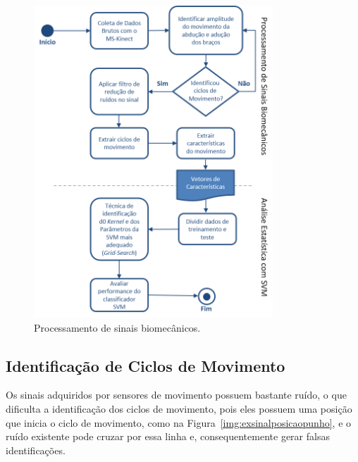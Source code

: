 \begin{figure}[!htb]
     \centering
     \includegraphics[width=0.8\textwidth]{./img/biomecprocessor2.png}
     \caption{Processamento de sinais biomecânicos.}
     \label{img:process_bio}
\end{figure}


\subsection{Identificação de Ciclos de Movimento}\label{section:identificao_ciclos}

Os sinais adquiridos por sensores de movimento possuem bastante ruído, o que dificulta a identificação dos ciclos de movimento, pois eles possuem uma posição que inicia o ciclo de movimento, como na Figura~\ref{img:exsinalposicaopunho}, e o ruído existente pode cruzar por essa linha e, consequentemente gerar falsas identificações. 


